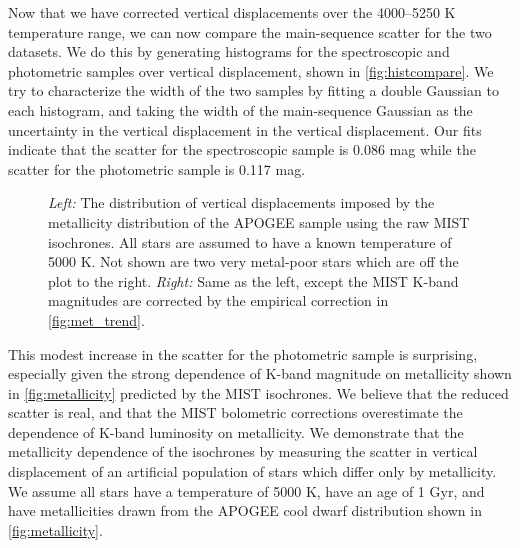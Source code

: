 \documentclass[manuscript]{aastex6}
\begin{document}
Now that we have corrected vertical displacements over the 4000--5250 K
temperature range, we can now compare the main-sequence scatter for the two
datasets. We do this by generating histograms for the spectroscopic and
photometric samples over vertical displacement, shown in
\cref{fig:histcompare}. We try to characterize the width of the two samples by
fitting a double Gaussian to each histogram, and taking the width of the
main-sequence Gaussian as the uncertainty in the vertical displacement in the
vertical displacement. Our fits indicate that the scatter for the spectroscopic
sample is 0.086 mag while the scatter for the photometric sample is 0.117 mag.

\begin{figure*}[htb]
    \centering
    \caption{\emph{Left:} The distribution of vertical displacements imposed
    by the metallicity distribution of the APOGEE sample using the raw MIST
    isochrones. All stars are assumed to have a known temperature of 5000 K. 
    Not shown are two very metal-poor stars which are off the plot to the 
    right. \emph{Right:} Same as the left, except the MIST K-band magnitudes
are corrected by the empirical correction in
\cref{fig:met_trend}.}\label{fig:met_spread}
\end{figure*}

This modest increase in the scatter for the photometric sample is surprising,
especially given the strong dependence of K-band magnitude on metallicity shown
in \cref{fig:metallicity} predicted by the MIST isochrones. We believe that the
reduced scatter is real, and that the MIST bolometric corrections overestimate 
the dependence of K-band luminosity on metallicity. We demonstrate that the
metallicity dependence of the isochrones by measuring the scatter in vertical
displacement of an artificial population of stars which differ only by 
metallicity. We assume all stars have a temperature of 5000 K, have an age
of 1 Gyr, and have metallicities drawn from the APOGEE cool dwarf distribution
shown in \cref{fig:metallicity}.
\end{document}
